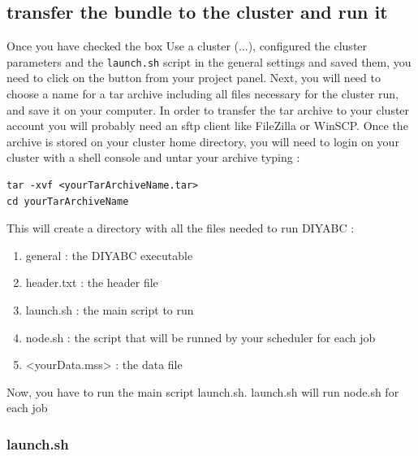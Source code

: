 \subsection{transfer the bundle to the cluster and run it}\label{clusterrun}
Once you have checked the box \textsf{Use a cluster (...)}, configured the cluster parameters and the \texttt{launch.sh} script in the general settings and saved them, you need to click on the  button from your project panel. Next, you will need to choose a name for a tar archive including all files necessary for the cluster run, and save it on your computer. In order to transfer the tar archive to your cluster account you will probably need an sftp client like FileZilla or WinSCP. Once the archive is stored on your cluster home directory, you will need to login on your cluster with a shell console and untar your archive typing :\\
   \begin{minipage}{0.9\textwidth}
\begin{lstlisting}
tar -xvf <yourTarArchiveName.tar>
cd yourTarArchiveName
\end{lstlisting}
   \end{minipage}
 This will create a directory with all the files needed to run DIYABC :
\begin{enumerate}
    \item \textsf{general} : the DIYABC executable
    \item \textsf{header.txt} : the header file
    \item \textsf{launch.sh} : the main script to run
    \item \textsf{node.sh} : the script that will be runned by your scheduler for each job
    \item \textsf{<yourData.mss>} : the data file 
\end{enumerate}
Now, you have to run the main script launch.sh. launch.sh will run node.sh for each job

\subsubsection{launch.sh}

